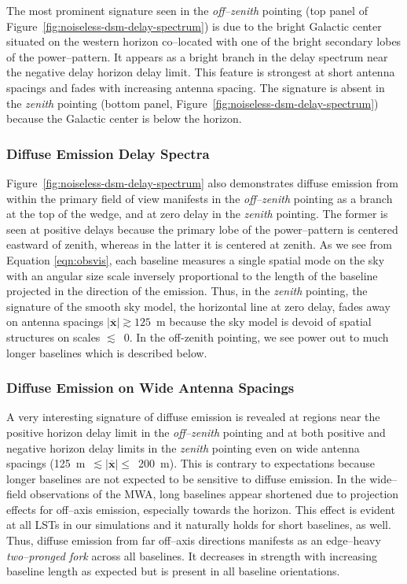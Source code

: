 \documentclass[preprint2,iop,numberedappendix]{emulateapj}
\begin{document}
The most prominent signature seen in the {\it off--zenith} pointing (top panel of Figure~\ref{fig:noiseless-dsm-delay-spectrum}) is due to the bright Galactic center situated on the western horizon co--located with one of the bright secondary lobes of the power--pattern. It appears as a bright branch in the delay spectrum near the negative delay horizon delay limit. This feature is strongest at short antenna spacings and fades with increasing antenna spacing. The signature is absent in the {\it zenith} pointing (bottom panel, Figure~\ref{fig:noiseless-dsm-delay-spectrum}) because the Galactic center is below the horizon. 

\subsubsection{Diffuse Emission Delay Spectra}\label{sec:diffuse-features}

Figure~\ref{fig:noiseless-dsm-delay-spectrum} also demonstrates diffuse emission from within the primary field of view manifests in the {\it off--zenith} pointing as a branch at the top of the wedge, and at zero delay in the {\it zenith} pointing. The former is seen at positive delays because the primary lobe of the power--pattern is centered eastward of zenith, whereas in the latter it is centered at zenith. As we see from Equation \ref{eqn:obsvis}, each baseline measures a single spatial mode on the sky with an angular size scale inversely proportional to the length of the baseline projected in the direction of the emission. Thus, in the {\it zenith} pointing, the signature of the smooth sky model, the horizontal line at zero delay, fades away on antenna spacings $|\overline{\mathbf{x}}| \gtrsim 125$~m because the sky model is devoid of spatial structures on scales $\lesssim$~0. In the off-zenith pointing, we see power out to much longer baselines which is described below.

\subsubsection{Diffuse Emission on Wide Antenna Spacings}\label{sec:diffuse-long-baselines}

A very interesting signature of diffuse emission is revealed at regions near the positive horizon delay limit in the {\it off--zenith} pointing and at both positive and negative horizon delay limits in the {\it zenith} pointing even on wide antenna spacings (125~m~$\lesssim |\overline{\mathbf{x}}|\le$~200~m). This is contrary to expectations because longer baselines are not expected to be sensitive to diffuse emission. In the wide--field observations of the MWA, long baselines appear shortened due to projection effects for off--axis emission, especially towards the horizon.  This effect is evident at all LSTs in our simulations and it naturally holds for short baselines, as well. Thus, diffuse emission from far off--axis directions manifests as an edge--heavy {\it two--pronged fork} across all baselines. It decreases in strength with increasing baseline length as expected but is present in all baseline orientations.   %
\end{document}
